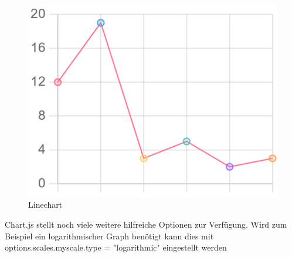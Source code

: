 \begin{figure}[H]
    \centering
    \includegraphics[scale=0.3]{pics/lineChart.png}
    \caption{Linechart}
\end{figure}

Chart.js stellt noch viele weitere hilfreiche Optionen zur Verfügung. Wird
zum Beispiel ein logarithmischer Graph benötigt kann dies mit options.scales.myscale.type = "logarithmic" eingestellt werden

